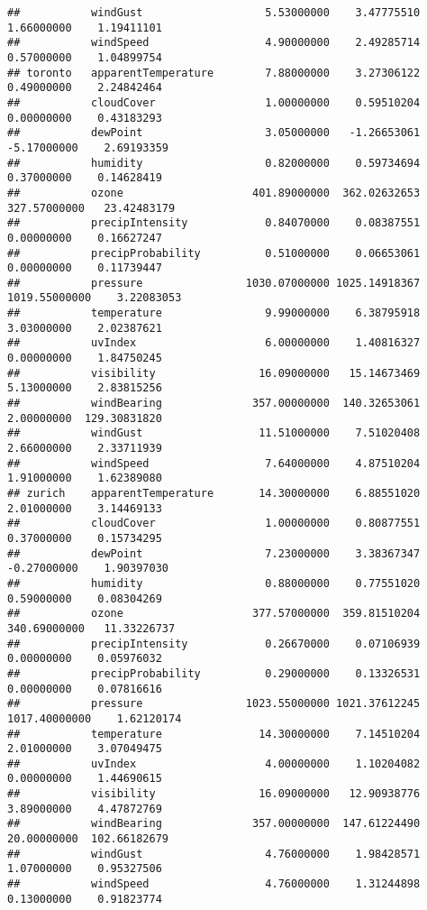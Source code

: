 \documentclass[]{book}
\begin{document}
\begin{verbatim}
##           windGust                   5.53000000    3.47775510    1.66000000    1.19411101
##           windSpeed                  4.90000000    2.49285714    0.57000000    1.04899754
## toronto   apparentTemperature        7.88000000    3.27306122    0.49000000    2.24842464
##           cloudCover                 1.00000000    0.59510204    0.00000000    0.43183293
##           dewPoint                   3.05000000   -1.26653061   -5.17000000    2.69193359
##           humidity                   0.82000000    0.59734694    0.37000000    0.14628419
##           ozone                    401.89000000  362.02632653  327.57000000   23.42483179
##           precipIntensity            0.84070000    0.08387551    0.00000000    0.16627247
##           precipProbability          0.51000000    0.06653061    0.00000000    0.11739447
##           pressure                1030.07000000 1025.14918367 1019.55000000    3.22083053
##           temperature                9.99000000    6.38795918    3.03000000    2.02387621
##           uvIndex                    6.00000000    1.40816327    0.00000000    1.84750245
##           visibility                16.09000000   15.14673469    5.13000000    2.83815256
##           windBearing              357.00000000  140.32653061    2.00000000  129.30831820
##           windGust                  11.51000000    7.51020408    2.66000000    2.33711939
##           windSpeed                  7.64000000    4.87510204    1.91000000    1.62389080
## zurich    apparentTemperature       14.30000000    6.88551020    2.01000000    3.14469133
##           cloudCover                 1.00000000    0.80877551    0.37000000    0.15734295
##           dewPoint                   7.23000000    3.38367347   -0.27000000    1.90397030
##           humidity                   0.88000000    0.77551020    0.59000000    0.08304269
##           ozone                    377.57000000  359.81510204  340.69000000   11.33226737
##           precipIntensity            0.26670000    0.07106939    0.00000000    0.05976032
##           precipProbability          0.29000000    0.13326531    0.00000000    0.07816616
##           pressure                1023.55000000 1021.37612245 1017.40000000    1.62120174
##           temperature               14.30000000    7.14510204    2.01000000    3.07049475
##           uvIndex                    4.00000000    1.10204082    0.00000000    1.44690615
##           visibility                16.09000000   12.90938776    3.89000000    4.47872769
##           windBearing              357.00000000  147.61224490   20.00000000  102.66182679
##           windGust                   4.76000000    1.98428571    1.07000000    0.95327506
##           windSpeed                  4.76000000    1.31244898    0.13000000    0.91823774
\end{verbatim}
\end{document}
